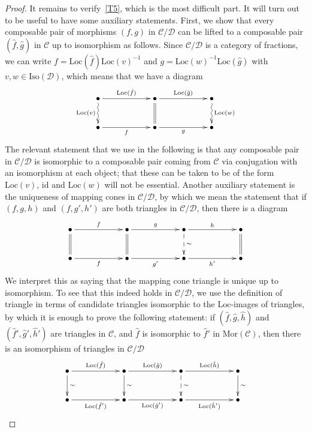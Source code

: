 \documentclass{amsproc}
\theoremstyle{definition}
\begin{document}
\begin{proof}
It remains to verify~\ref{T5}, which is the most difficult part. It will turn out to be useful to have some auxiliary statements. First, we show that every composable pair of morphisms $(f,g)$ in ${\mathcal{C}}/{\mathcal{D}}$ can be lifted to a composable pair $(\hat{f},\hat{g})$ in ${\mathcal{C}}$ up to isomorphism as follows. Since ${\mathcal{C}}/{\mathcal{D}}$ is a category of fractions, we can write $f={\mathrm{Loc}}(\hat{f}){\mathrm{Loc}}(v)^{-1}$ and $g={\mathrm{Loc}}(w)^{-1}{\mathrm{Loc}}(\hat{g})$ with $v,w\in{\mathrm{Iso}}({\mathcal{D}})$, which means that we have a diagram
\[
	\xymatrix@!C@C+33pt{ \bullet \ar[r]^{{\mathrm{Loc}}(\hat{f})} \ar@{~>}[d]_{{\mathrm{Loc}}(v)} & \bullet \ar[r]^{{\mathrm{Loc}}(\hat{g})} \ar@{=}[d] & \bullet \ar@{~>}[d]^{{\mathrm{Loc}}(w)} \\
	\bullet \ar[r]_f & \bullet \ar[r]_g & \bullet }
\]
The relevant statement that we use in the following is that any composable pair in ${\mathcal{C}}/{\mathcal{D}}$ is isomorphic to a composable pair coming from ${\mathcal{C}}$ via conjugation with an isomorphism at each object; that these can be taken to be of the form ${\mathrm{Loc}}(v)$, ${\mathrm{id}}$ and ${\mathrm{Loc}}(w)$ will not be essential. Another auxiliary statement is the uniqueness of mapping cones in ${\mathcal{C}}/{\mathcal{D}}$, by which we mean the statement that if $(f,g,h)$ and $(f,g',h')$ are both triangles in ${\mathcal{C}}/{\mathcal{D}}$, then there is a diagram
\[
	\xymatrix@!C@C+33pt{ \bullet \ar[r]^f \ar@{=}[d] & \bullet \ar[r]^g \ar@{=}[d] & \bullet \ar[r]^h \ar@{-->}[d]^{\sim} & \bullet \ar@{=}[d] \\
	\bullet \ar[r]_f & \bullet \ar[r]_{g'} & \bullet \ar[r]_{h'} & \bullet}
\]
We interpret this as saying that the mapping cone triangle is unique up to isomorphism. To see that this indeed holds in ${\mathcal{C}}/{\mathcal{D}}$, we use the definition of triangle in terms of candidate triangles isomorphic to the ${\mathrm{Loc}}$-images of triangles, by which it is enough to prove the following statement: if $(\hat{f},\hat{g},\hat{h})$ and $(\hat{f}',\hat{g}',\hat{h}')$ are triangles in ${\mathcal{C}}$, and $\hat{f}$ is isomorphic to $\hat{f}'$ in ${\mathrm{Mor}}({\mathcal{C}})$, then there is an isomorphism of triangles in ${\mathcal{C}}/{\mathcal{D}}$
\[
	\xymatrix@!C@C+33pt{ \bullet \ar[r]^{{\mathrm{Loc}}(\hat{f})} \ar[d]^{\sim} & \bullet \ar[r]^{{\mathrm{Loc}}(\hat{g})} \ar[d]^{\sim} & \bullet \ar[r]^{{\mathrm{Loc}}(\hat{h})} \ar@{-->}[d]^{\sim} & \bullet \ar[d]^{\sim} \\
	\bullet \ar[r]_{{\mathrm{Loc}}(\hat{f}')} & \bullet \ar[r]_{{\mathrm{Loc}}(\hat{g}')} & \bullet \ar[r]_{{\mathrm{Loc}}(\hat{h}')} & \bullet}
\]
\end{proof}
\end{document}
